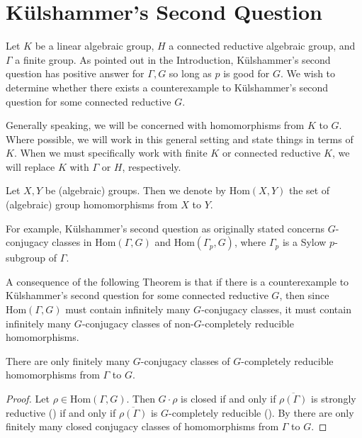 
\chapter{K\"ulshammer's Second Question}
\label{Chapter4}

Let $K$ be a linear algebraic group, $H$ a connected reductive algebraic group, and $\Gamma$ a finite group.
As pointed out in the Introduction, K\"ulshammer's second question has positive answer for $\Gamma, G$ so long as $p$ is good for $G$. We wish to determine whether there exists a counterexample to K\"ulshammer's second question for some connected reductive $G$.

Generally speaking, we will be concerned with homomorphisms from $K$ to $G$. Where possible, we will work in this general setting and state things in terms of $K$. When we must specifically work with finite $K$ or connected reductive $K$, we will replace $K$ with $\Gamma$ or $H$, respectively.
\begin{definition} Let $X,Y$ be (algebraic) groups. Then we denote by $\mathrm{Hom}(X, Y)$ the set of (algebraic) group homomorphisms from $X$ to $Y$.
\end{definition}

For example, K\"ulshammer's second question as originally stated concerns $G$-conjugacy classes in $\mathrm{Hom}(\Gamma, G)$ and $\mathrm{Hom}(\Gamma_p, G)$, where $\Gamma_p$ is a Sylow $p$-subgroup of $\Gamma$.

A consequence of the following Theorem  is that if there is a counterexample to K\"ulshammer's second question for some connected reductive $G$, then since $\mathrm{Hom}(\Gamma, G)$ must contain infinitely many $G$-conjugacy classes, it must contain infinitely many $G$-conjugacy classes of non-$G$-completely reducible homomorphisms.

\begin{theorem} \label{thm:finiteGCR} There are only finitely many $G$-conjugacy classes of $G$-completely reducible homomorphisms from $\Gamma$ to $G$.
\end{theorem}
\begin{proof}
Let $\rho\in \mathrm{Hom}(\Gamma, G)$. Then $G\cdot \rho$ is closed if and only if $\overline{\rho(\Gamma)}$ is strongly reductive (\cite[Proposition 2.16]{bate2005geometric}) if and only if $\overline{\rho(\Gamma)}$ is $G$-completely reducible (\cite[Theorem 3.1]{bate2005geometric}). By \cite[Theorem 1.2]{martin2003reductive} there are only finitely many closed conjugacy classes of homomorphisms from $\Gamma$ to $G$.
\end{proof}

